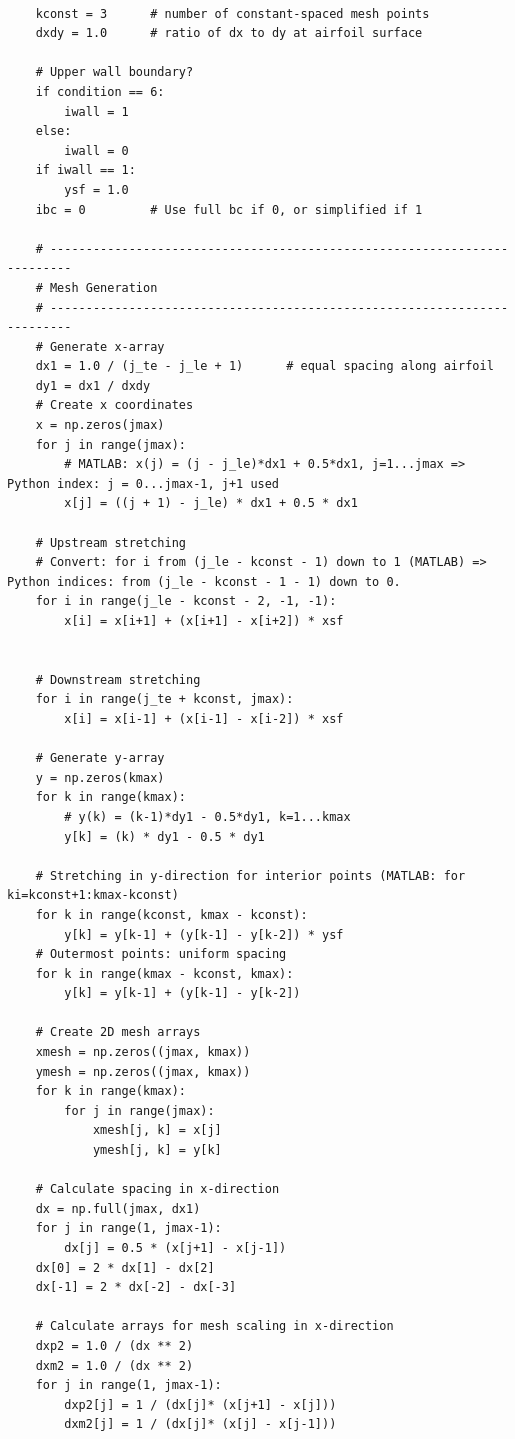 \documentclass[12pt]{article}
\theoremstyle{definition}
\begin{document}
\begin{verbatim}
    
    kconst = 3      # number of constant-spaced mesh points
    dxdy = 1.0      # ratio of dx to dy at airfoil surface

    # Upper wall boundary?
    if condition == 6:
        iwall = 1
    else:
        iwall = 0
    if iwall == 1:
        ysf = 1.0
    ibc = 0         # Use full bc if 0, or simplified if 1

    # -------------------------------------------------------------------------
    # Mesh Generation
    # -------------------------------------------------------------------------
    # Generate x-array
    dx1 = 1.0 / (j_te - j_le + 1)      # equal spacing along airfoil
    dy1 = dx1 / dxdy
    # Create x coordinates 
    x = np.zeros(jmax)
    for j in range(jmax):
        # MATLAB: x(j) = (j - j_le)*dx1 + 0.5*dx1, j=1...jmax => Python index: j = 0...jmax-1, j+1 used
        x[j] = ((j + 1) - j_le) * dx1 + 0.5 * dx1

    # Upstream stretching
    # Convert: for i from (j_le - kconst - 1) down to 1 (MATLAB) => Python indices: from (j_le - kconst - 1 - 1) down to 0.
    for i in range(j_le - kconst - 2, -1, -1):
        x[i] = x[i+1] + (x[i+1] - x[i+2]) * xsf


    # Downstream stretching 
    for i in range(j_te + kconst, jmax):
        x[i] = x[i-1] + (x[i-1] - x[i-2]) * xsf

    # Generate y-array
    y = np.zeros(kmax)
    for k in range(kmax):
        # y(k) = (k-1)*dy1 - 0.5*dy1, k=1...kmax
        y[k] = (k) * dy1 - 0.5 * dy1

    # Stretching in y-direction for interior points (MATLAB: for ki=kconst+1:kmax-kconst)
    for k in range(kconst, kmax - kconst):
        y[k] = y[k-1] + (y[k-1] - y[k-2]) * ysf
    # Outermost points: uniform spacing
    for k in range(kmax - kconst, kmax):
        y[k] = y[k-1] + (y[k-1] - y[k-2])

    # Create 2D mesh arrays
    xmesh = np.zeros((jmax, kmax))
    ymesh = np.zeros((jmax, kmax))
    for k in range(kmax):
        for j in range(jmax):
            xmesh[j, k] = x[j]
            ymesh[j, k] = y[k]

    # Calculate spacing in x-direction
    dx = np.full(jmax, dx1)
    for j in range(1, jmax-1):
        dx[j] = 0.5 * (x[j+1] - x[j-1])
    dx[0] = 2 * dx[1] - dx[2]
    dx[-1] = 2 * dx[-2] - dx[-3]

    # Calculate arrays for mesh scaling in x-direction
    dxp2 = 1.0 / (dx ** 2)
    dxm2 = 1.0 / (dx ** 2)
    for j in range(1, jmax-1):
        dxp2[j] = 1 / (dx[j]* (x[j+1] - x[j]))
        dxm2[j] = 1 / (dx[j]* (x[j] - x[j-1]))
        

\end{verbatim}
\end{document}
